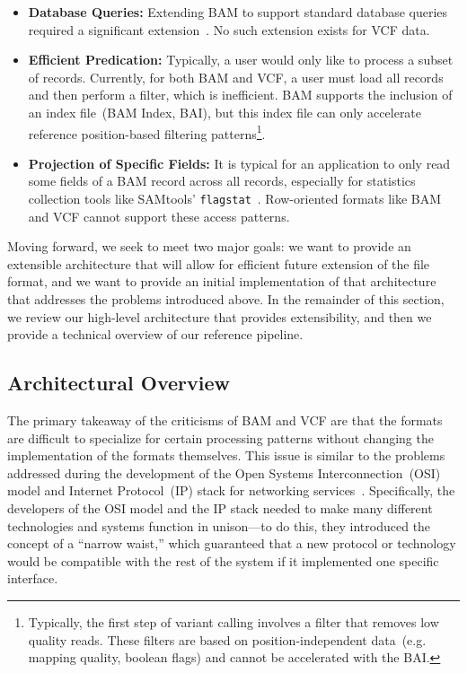 \documentclass{bioinfo}
\begin{document}
\begin{itemize}
\item \textbf{Database Queries:} Extending BAM to support standard database queries required a significant extension~\citep{kozanitis13}.
No such extension exists for VCF data.
\item \textbf{Efficient Predication:} Typically, a user would only like to process a subset of records. Currently, for both BAM and VCF, a user must load all
records and then perform a filter, which is inefficient. BAM supports the inclusion of an index file~(BAM Index, BAI), but this index file can only accelerate
reference position-based filtering patterns\footnote{Typically, the first step of variant calling involves a filter that removes low quality reads. These filters
are based on position-independent data~(e.g. mapping quality, boolean flags) and cannot be accelerated with the BAI.}.
\item \textbf{Projection of Specific Fields:} It is typical for an application to only read some fields of a BAM record across all records, especially for
statistics collection tools like SAMtools' \texttt{flagstat}~\citep{li09}. Row-oriented formats like BAM and VCF cannot support these access patterns.
\end{itemize}

Moving forward, we seek to meet two major goals: we want to provide an extensible architecture that will allow for efficient future extension of the
file format, and we want to provide an initial implementation of that architecture that addresses the problems introduced above. In the remainder
of this section, we review our high-level architecture that provides extensibility, and then we provide a technical overview of our reference pipeline.

\subsection{Architectural Overview}
\label{sec:architectural-overview}

The primary takeaway of the criticisms of BAM and VCF are that the formats are difficult to specialize for certain processing patterns without
changing the implementation of the formats themselves. This issue is similar to the problems addressed during the development of the Open
Systems Interconnection~(OSI) model and Internet Protocol~(IP) stack for networking services~\citep{zimmermann80}. Specifically, the developers
of the OSI model and the IP stack needed to make many different technologies and systems function in unison---to do this, they introduced the
concept of a ``narrow waist,'' which guaranteed that a new protocol or technology would be compatible with the rest of the system if it implemented
one specific interface.
\end{document}
